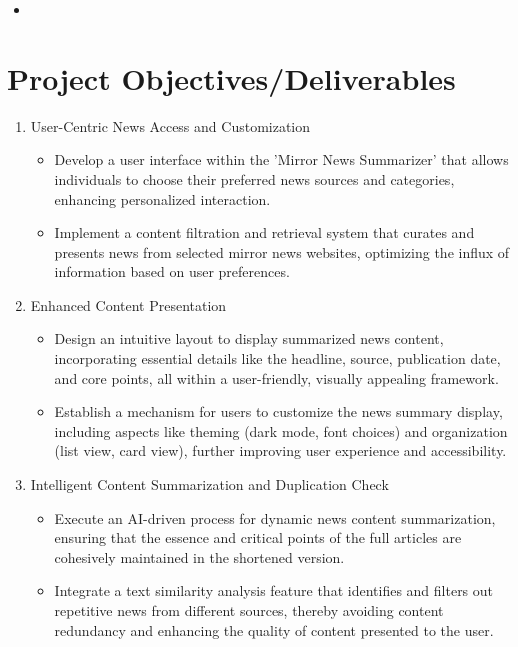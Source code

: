\documentclass[a4paper]{article}
\begin{document}
\begin{itemize}
    \item
\end{itemize}

\section{Project Objectives/Deliverables}

\begin{enumerate}
    \item User-Centric News Access and Customization
        \begin{itemize}
            \item Develop a user interface within the 'Mirror News Summarizer' that allows individuals to choose their preferred news sources and categories, enhancing personalized interaction.
            \item Implement a content filtration and retrieval system that curates and presents news from selected mirror news websites, optimizing the influx of information based on user preferences.
        \end{itemize} 
    \item Enhanced Content Presentation
        \begin{itemize}
            \item Design an intuitive layout to display summarized news content, incorporating essential details like the headline, source, publication date, and core points, all within a user-friendly, visually appealing framework.
            \item Establish a mechanism for users to customize the news summary display, including aspects like theming (dark mode, font choices) and organization (list view, card view), further improving user experience and accessibility.
        \end{itemize}
    \item Intelligent Content Summarization and Duplication Check
        \begin{itemize}
            \item Execute an AI-driven process for dynamic news content summarization, ensuring that the essence and critical points of the full articles are cohesively maintained in the shortened version.
            \item Integrate a text similarity analysis feature that identifies and filters out repetitive news from different sources, thereby avoiding content redundancy and enhancing the quality of content presented to the user.

\end{itemize}
\end{enumerate}
\end{document}
